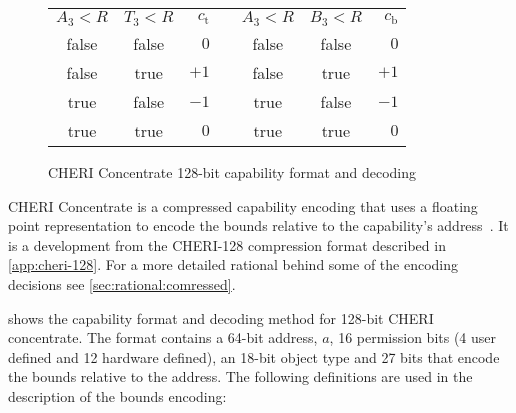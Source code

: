 \begin{figure}
\begin{center}
\begin{tabular}{@{}ccr@{}p{1em}@{}ccr@{}}
\cmidrule[\heavyrulewidth]{1-3}\cmidrule[\heavyrulewidth]{5-7}
$A_3<R$ & $T_3<R$ & $c_\text{t}$&&$A_3<R$ & $B_3<R$ & $c_\text{b}$\\
\cmidrule{1-3}\cmidrule{5-7}
false & false & $0$  &&false & false & $0$  \\
false & true  & $+1$ &&false & true  & $+1$ \\
true  & false & $-1$ &&true  & false & $-1$ \\
true  & true  & $0$  &&true  & true  & $0$  \\
\cmidrule[\heavyrulewidth]{1-3}\cmidrule[\heavyrulewidth]{5-7}
\end{tabular}
\end{center}
\caption{CHERI Concentrate 128-bit capability format and decoding}
\label{fig:cheric128}
\vspace{-1.5em}
\end{figure}

CHERI Concentrate is a compressed capability encoding that uses a floating point
representation to encode the bounds relative to the capability's address~\cite{Woodruff2019}.
It is a development from the CHERI-128 compression format described in \cref{app:cheri-128}.
For a more detailed rational behind some of the encoding decisions see \cref{sec:rational:comressed}.

 shows the capability format and decoding method for 128-bit CHERI concentrate.
The format contains a 64-bit address, $a$, 16 permission bits (4 user defined and 12 hardware defined), an 18-bit object type and 27 bits that encode the bounds relative to the address.
The following definitions are used in the description of the bounds encoding:

